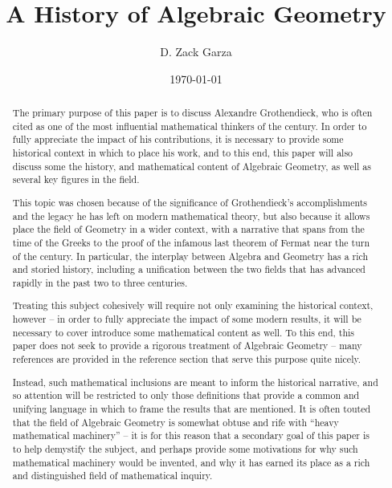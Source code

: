 \documentclass{article}
\title{A History of Algebraic Geometry}
\author{D. Zack Garza}
\date{\today}
\theoremstyle{definition}
\begin{document}
\maketitle

\tableofcontents

\newpage

\begin{abstract}
The primary purpose of this paper is to discuss Alexandre Grothendieck,
who is often cited as one of the most influential mathematical thinkers
of the  century. In order to fully appreciate the impact of his
contributions, it is necessary to provide some historical context in
which to place his work, and to this end, this paper will also discuss some
the history, and mathematical content of Algebraic Geometry, as well as several key figures in the field.

This topic was chosen because of the significance of
Grothendieck's accomplishments and the legacy he has left on modern
mathematical theory, but also because it allows place the field of
Geometry in a wider context, with a narrative that spans from the time
of the Greeks to the proof of the infamous last theorem of Fermat near
the turn of the  century. In particular, the interplay between
Algebra and Geometry has a rich and storied history, including a
unification between the two fields that has advanced rapidly in the past
two to three centuries.

Treating this subject cohesively will require not only examining the
historical context, however -- in order to fully appreciate the impact
of some modern results, it will be necessary to cover introduce some mathematical content as well. To this end, this paper does not
seek to provide a rigorous treatment of Algebraic Geometry -- many
references are provided in the reference section that serve this purpose
quite nicely.

Instead, such mathematical inclusions are meant to inform the historical
narrative, and so attention will be restricted to only those definitions
that provide a common and unifying language in which to frame the
results that are mentioned. It is often touted that the field of
Algebraic Geometry is somewhat obtuse and rife with ``heavy mathematical
machinery'' -- it is for this reason that a secondary goal of this
paper is to help demystify the subject, and perhaps provide some
motivations for why such mathematical machinery would be invented, and
why it has earned its place as a rich and distinguished field of
mathematical inquiry.


\end{abstract}
\end{document}

